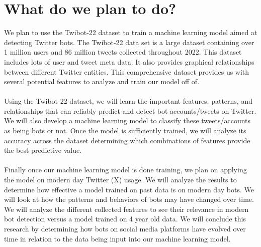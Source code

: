 \section{What do we plan to do?}
We plan to use the Twibot-22 dataset to train a machine learning model aimed at detecting Twitter bots. The Twibot-22 data set is a large dataset containing over 1 million users and 86 million tweets collected throughout 2022. This dataset includes lots of user and tweet meta data. It also provides graphical relationships between different Twitter entities. This comprehensive dataset provides us with several potential features to analyze and train our model off of. 
\\\\
Using the Twibot-22 dataset, we will learn the important features, patterns, and relationships that can reliably predict and detect bot accounts/tweets on Twitter. We will also develop a machine learning model to classify these tweets/accounts as being bots or not. Once the model is sufficiently trained, we will analyze its accuracy across the dataset determining which combinations of features provide the best predictive value.
\\\\
Finally once our machine learning model is done training, we plan on applying the model on modern day Twitter (X) usage. We will analyze the results to determine how effective a model trained on past data is on modern day bots. We will look at how the patterns and behaviors of bots may have changed over time. We will analyze the different collected features to see their relevance in modern bot detection versus a model trained on 4 year old data. We will conclude this research by determining how bots on social media platforms have evolved over time in relation to the data being input into our machine learning model. 

